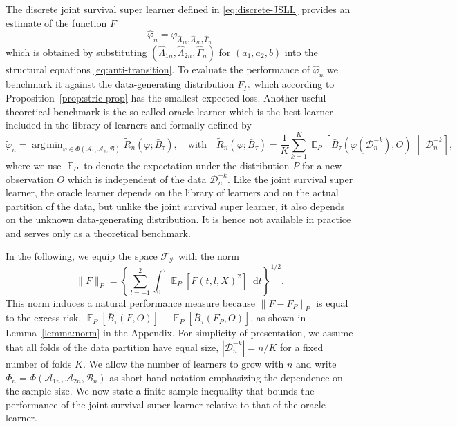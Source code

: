 \documentclass[a4paper,danish]{article}
\DeclareMathOperator{\E}{\mathbb{E}} %
\renewcommand{\phi}{\varphi}
\newcommand*\diff{\mathop{}\!\mathrm{d}}
\newcommand{\midd}{\; \middle|\;}
\newcommand{\1}{\mathds{1}}
\DeclareMathOperator*{\argmin}{\arg\!\min}
\newcommand{\data}{\ensuremath{\mathcal{D}}}
\theoremstyle{plain} %
\numberwithin{theorem}{section}
\theoremstyle{definition} %
\theoremstyle{remark}
\begin{document}
The discrete joint survival super learner defined in
\eqref{eq:discrete-JSLL} provides an estimate of the function \(F\)
\begin{equation*}
  \hat{\phi}_n=\phi_{\hat \Lambda_{1n},\hat \Lambda_{2n}, \hat \Gamma_{n}}
\end{equation*} which is obtained by substituting \((\hat
\Lambda_{1n},\hat \Lambda_{2n}, \hat \Gamma_{n})\) for \((a_1,a_2,b)\) into the structural
equations \eqref{eq:anti-transition}. To evaluate the performance of
\(\hat{\phi}_n\) we benchmark it against the data-generating
distribution \( F_P \), which according to
Proposition~\ref{prop:stric-prop} has the smallest expected
loss. Another useful theoretical benchmark is the so-called oracle
learner which is the best learner included in the library of learners
and formally defined by
\begin{equation*}
  \tilde{\phi}_n
  =  \argmin_{\phi \in \Phi(\mathcal{A}_1, \mathcal{A}_2, \mathcal{B}) }
  \tilde{R}_{n}(\phi ; \bar{B}_{\tau}),
  \quad \text{with} \quad 
  \tilde{R}_n(\phi; \bar{B}_{\tau})=
  \frac{1}{K}\sum_{k=1}^{K} 
  \E_P{
    \left[
      \bar{B}_{\tau}
      {
        \left(
          \phi{ (\data_n^{-k})}
          , O
        \right)
      } 
      \midd  \data_n^{-k}
    \right]}
  ,
\end{equation*}
where we use \( \E_P \) to denote the expectation
under the distribution \( P \) for a new observation \( O \) which is
independent of the data \( \data_n^{-k} \). Like the joint survival
super learner, the oracle learner depends on the library of learners
and on the actual partition of the data, but unlike the joint survival
super learner, it also depends on the unknown data-generating
distribution. It is hence not available in practice and serves only as
a theoretical benchmark.

In the following, we equip the space \( \mathcal{F}_{\mathcal{P}} \)
with the norm
\begin{equation}
  \label{eq:norm}
  \| F \|_{P} = 
  \left\{
    \sum_{l=-1}^{2}
    \int_0^{\tau} \E_P{\left[ F(t, l, X)^2 \right]} \diff t
  \right\}^{1/2}.
\end{equation}
This norm induces a natural performance measure because
$\| F-F_P \|_{P}$ is equal to the excess risk,
\( \E_P{[\bar{B}_\tau(F, O)]} - \E_P{[\bar{B}_\tau(F_P, O)]} \), as
shown in Lemma~\ref{lemma:norm} in the Appendix. For simplicity of
presentation, we assume that all folds of the data partition have
equal size, \( |\data_n^{-k}| = n/K \) for a fixed number of folds
\( K \). We allow the number of learners to grow with \( n \) and
write
\( \Phi_n=\Phi(\mathcal{A}_{1n}, \mathcal{A}_{2n},
\mathcal{B}_n)\) as short-hand notation emphasizing the dependence on
the sample size. We now state a finite-sample inequality that bounds
the performance of the joint survival super learner relative to that
of the oracle learner.
\end{document}
